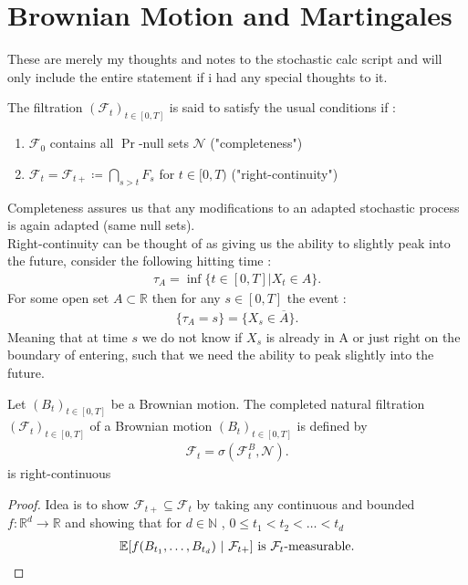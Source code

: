 \chapter{Brownian Motion and Martingales}
These are merely my thoughts and notes to the stochastic calc script and will only 
include the entire statement if i had any special thoughts to it. \\[1ex]

\begin{definition}
  The filtration $(\mathcal{F}_t)_{t \in [0,T]}$ is said to satisfy the usual conditions if : 
  \begin{enumerate}
    \item $\mathcal{F}_0$ contains all $\Pr$-null sets $\mathcal{N}$ ("completeness") 
    \item $\mathcal{F}_t = \mathcal{F}_{t+} \coloneqq \bigcap_{s>t} F_s$ for $t \in [0,T)$ ("right-continuity")
  \end{enumerate}
\end{definition}
\begin{remark}
 Completeness assures us that any modifications to an adapted stochastic process is again adapted (same null sets). \\
 Right-continuity can be thought of as giving us the ability to slightly peak into the future, consider the following hitting time :
 \begin{align*}
   \tau_A = \inf \{t \in [0,T] | X_t \in A\}
 .\end{align*}
 For some open set $A \subset  \mathbb{R}$ then for any $s \in  [0,T]$  the event : 
 \begin{align*}
   \{\tau_A = s\}   = \{X_s \in  \overline{A} \}  
 .\end{align*}
 Meaning that at time $s$ we do not know if $X_s$ is already in A or just right on the boundary of entering, such that we need the ability to peak slightly into
 the future.
\end{remark}
\begin{prop}
  Let $(B_t)_{t \in [0,T]}$  be a Brownian motion. The completed natural filtration $(\mathcal{F}_t)_{t \in  [0,T]}$ of a Brownian motion $(B_t)_{t \in [0,T]}$ is defined by  
  \begin{align*}
    \mathcal{F}_t =  \sigma(\mathcal{F}_t^{B},\mathcal{N} )
  .\end{align*}
  is right-continuous 
\end{prop}
\begin{proof}
  Idea is to show $\mathcal{F}_{t+} \subseteq \mathcal{F}_t$ by taking any continuous and bounded $f : \mathbb{R}^{d} \to  \mathbb{R} $ and showing that for $d \in  \mathbb{N}$ , $0 \le t_1<t_2<\ldots <t_d$
  \begin{align*}
    \mathbb{E}[f(B_{t_1},\ldots ,B_{t_d}) \ | \ \mathcal{F}_{t+}] \text{ is } \mathcal{F}_t \text{-measurable}
  .\end{align*}
\end{proof}


